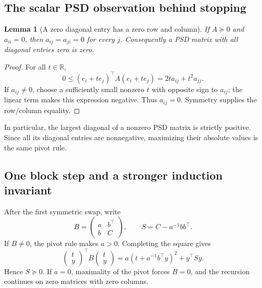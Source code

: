 \documentclass[11pt]{article}
\newcommand{\R}{\mathbb R}
\newtheorem{lemma}[theorem]{Lemma}
\theoremstyle{remark}\newtheorem{remark}[theorem]{Remark}
\numberwithin{equation}{section}
\begin{document}
\subsection{The scalar PSD observation behind stopping}
\begin{lemma}[A zero diagonal entry has a zero row and column]\label{lem:psdzero}
If $A\succeq0$ and $a_{ii}=0$, then $a_{ij}=a_{ji}=0$ for every $j$.
Consequently a PSD matrix with all diagonal entries zero is zero.
\end{lemma}
\begin{proof}
For all $t\in\R$,
\[
 0\le (e_i+t e_j)^\top A(e_i+t e_j)=2t a_{ij}+t^2a_{jj}.
\]
If $a_{ij}\ne0$, choose a sufficiently small nonzero $t$ with opposite
sign to $a_{ij}$; the linear term makes this expression negative.
Thus $a_{ij}=0$. Symmetry supplies the row/column equality.
\end{proof}
In particular, the largest diagonal of a nonzero PSD matrix is strictly
positive. Since all its diagonal entries are nonnegative, maximizing
their absolute values is the same pivot rule.

\subsection{One block step and a stronger induction invariant}
After the first symmetric swap, write
\[
 B=\begin{pmatrix}a&b^\top\\b&C\end{pmatrix},\qquad
 S=C-a^{-1}bb^\top.
\]
If $B\ne0$, the pivot rule makes $a>0$. Completing the square gives
\begin{equation}\label{eq:squares}
 \begin{pmatrix}t\\y\end{pmatrix}^{\!\top}
 B\begin{pmatrix}t\\y\end{pmatrix}
 =a(t+a^{-1}b^\top y)^2+y^\top S y.
\end{equation}
Hence $S\succeq0$. If $a=0$, maximality of the pivot forces $B=0$,
and the recursion continues on zero matrices with zero columns.
\end{document}
